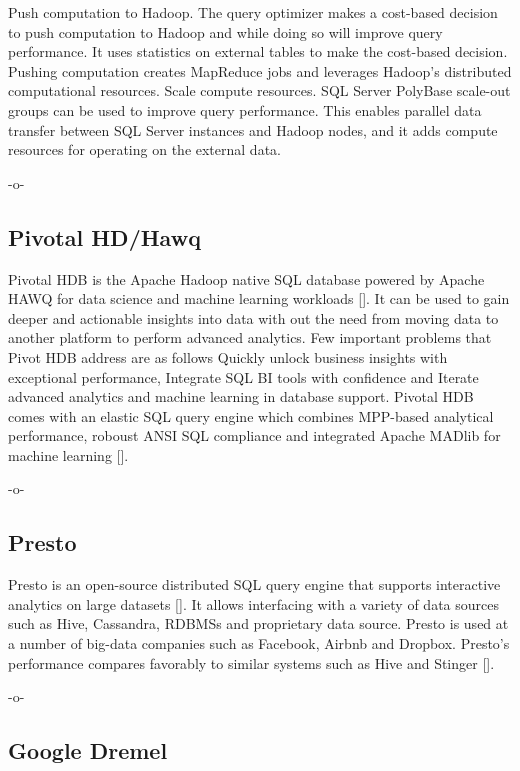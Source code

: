 Push computation to Hadoop. The query optimizer makes a cost-based
decision to push computation to Hadoop and while doing so will improve
query performance. It uses statistics on external tables to make the
cost-based decision. Pushing computation creates MapReduce jobs and
leverages Hadoop's distributed computational resources. Scale compute
resources. SQL Server PolyBase scale-out groups can be used to improve
query performance. This enables parallel data transfer between SQL
Server instances and Hadoop nodes, and it adds compute resources for
operating on the external data.

     -o-


\subsection{Pivotal HD/Hawq}

Pivotal HDB is the Apache Hadoop native SQL database powered by Apache
HAWQ for data science and machine learning workloads
[\cite{www-apache-hqwq}]. It can be used to gain deeper and actionable
insights into data with out the need from moving data to another
platform to perform advanced analytics. Few important problems that
Pivot HDB address are as follows Quickly unlock business insights with
exceptional performance, Integrate SQL BI tools with confidence and
Iterate advanced analytics and machine learning in database
support. Pivotal HDB comes with an elastic SQL query engine which
combines MPP-based analytical performance, roboust ANSI SQL compliance
and integrated Apache MADlib for machine learning
[\cite{www-pivotalhdb}].

     -o-
     
\subsection{Presto}

Presto is an open-source distributed SQL query engine that supports
interactive analytics on large datasets [\cite{www-presto}]. It allows
interfacing with a variety of data sources such as Hive, Cassandra,
RDBMSs and proprietary data source. Presto is used at a number of
big-data companies such as Facebook, Airbnb and Dropbox. Presto's
performance compares favorably to similar systems such as Hive and
Stinger [\cite{presto-paper-2014}].

     -o-

\subsection{Google Dremel}
 
